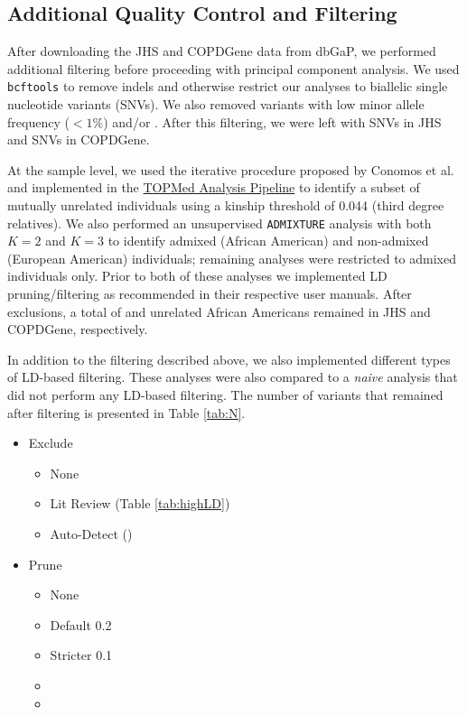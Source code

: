 \documentclass[12pt]{article}
\newcommand{\edit}[1]{{\color{red}{#1}}}
\newcommand{\add}[1]{{\color{red}{[... #1 ...]}}}
\begin{document}
\subsection{Additional Quality Control and Filtering}
\label{sec:filter}

After downloading the JHS and COPDGene data from dbGaP, we performed additional filtering before proceeding with principal component analysis.
We used \texttt{bcftools} \citep{bcftools} to remove indels and otherwise restrict our analyses to biallelic single nucleotide variants (SNVs). 
We also removed variants with low minor allele frequency ($< 1\%$) and/or \edit{high rates of missing calls ($>1\%$) --- STILL NEEDS TO BE IMPLEMENTED}.
After this filtering, we were left with \edit{???} SNVs in JHS and \edit{???} SNVs in COPDGene.

At the sample level, we used the iterative procedure proposed by Conomos et al. \citep{conomos2016related} and implemented in the \href{https://github.com/UW-GAC/analysis_pipeline}{TOPMed Analysis Pipeline} to identify a subset of mutually unrelated individuals using a kinship threshold of 0.044 (third degree relatives).
We also performed an unsupervised \texttt{ADMIXTURE} \citep{admixture} analysis with both $K = 2$ and $K = 3$ to identify admixed (African American) and non-admixed (European American) individuals; remaining analyses were restricted to admixed individuals only.
Prior to both of these analyses we implemented LD pruning/filtering as recommended in their respective user manuals.
After exclusions, a total of \edit{???} and \edit{???} unrelated African Americans remained in JHS and COPDGene, respectively.

In addition to the filtering described above, we also implemented different types of LD-based filtering.
\add{Describe the different types of LD-based filtering we compared (see below).}
These analyses were also compared to a \textit{naive} analysis that did not perform any LD-based filtering.
The number of variants that remained after filtering is presented in Table \ref{tab:N}.

\begin{itemize}
\item Exclude
	\begin{itemize}
	\item None
	\item Lit Review (Table \ref{tab:highLD})
	\item Auto-Detect (\add{using Prive package --- implement or skip for now??})
	\end{itemize}
\item Prune
	\begin{itemize}
	\item None
	\item Default 0.2
	\item Stricter 0.1
	\item \add{Stricter 0.05 ???}
	\item \add{Different window size ???}
	\end{itemize}
\end{itemize}
\end{document}
